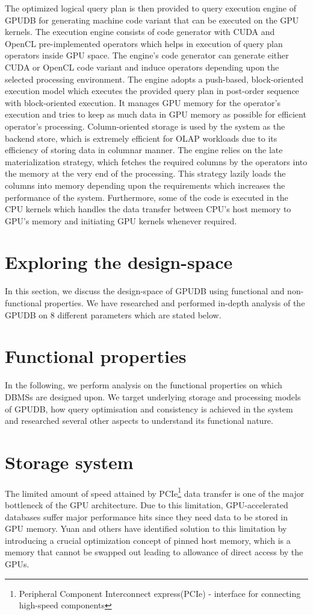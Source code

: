 The optimized logical query plan is then provided to query execution engine of GPUDB for generating machine code variant that can be executed on the GPU kernels. The execution engine consists of code generator with CUDA and OpenCL pre-implemented operators which helps in execution of query plan operators inside GPU space. The engine's code generator can generate either CUDA or OpenCL code variant and induce operators depending upon the selected processing environment. The engine adopts a push-based, block-oriented execution model which executes the provided query plan in post-order sequence\cite{gpudb_design_impl} with block-oriented execution. It manages GPU memory for the operator's execution and tries to keep as much data in GPU memory as possible for efficient operator's processing.
\newline
Column-oriented storage is used by the system as the backend store, which is extremely efficient for OLAP workloads due to its efficiency of storing data in columnar manner. The engine relies on the late materialization strategy\cite{gpudb_materialization}, which fetches the required columns by the operators into the memory at the very end of the processing. This strategy lazily loads the columns into memory depending upon the requirements which increases the performance of the system. Furthermore, some of the code is executed in the CPU kernels which handles the data transfer between CPU's host memory to GPU's memory and initiating GPU kernels whenever required.

\section*{Exploring the design-space}
In this section, we discuss the design-space of GPUDB using functional and non-functional properties. We have researched and performed in-depth analysis of the GPUDB on 8 different parameters which are stated below.

\section*{Functional properties}
In the following, we perform analysis on the functional properties on which DBMSs are designed upon. We target underlying storage and processing models of GPUDB, how query optimisation and consistency is achieved in the system and researched several other aspects to understand its functional nature.

\section*{Storage system}
The limited amount of speed attained by PCIe\footnote{Peripheral Component Interconnect express(PCIe) - interface for connecting high-speed components} data transfer is one of the major bottleneck of the GPU architecture. Due to this limitation, GPU-accelerated databases suffer major performance hits since they need data to be stored in GPU memory. Yuan and others have identified solution to this limitation by introducing a crucial optimization concept of pinned host memory, which is a memory that cannot be swapped out leading to allowance of direct access by the GPUs.

